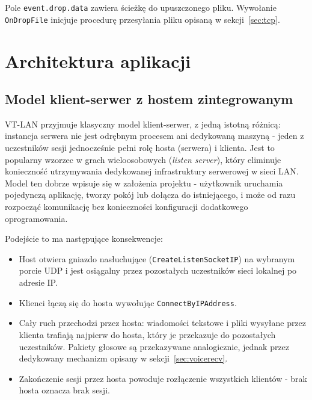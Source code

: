 Pole \texttt{event.drop.data} zawiera ścieżkę do upuszczonego pliku. Wywołanie \texttt{OnDropFile}
inicjuje procedurę przesyłania pliku opisaną w sekcji~\ref{sec:tcp}.


\section{Architektura aplikacji}
\label{sec:architektura}

\subsection*{Model klient-serwer z hostem zintegrowanym}

VT-LAN przyjmuje klasyczny model klient-serwer, z jedną istotną różnicą:
instancja serwera nie jest odrębnym procesem ani dedykowaną maszyną -
jeden z uczestników sesji jednocześnie pełni rolę hosta (serwera) i klienta.
Jest to popularny wzorzec w grach wieloosobowych (\textit{listen server}),
który eliminuje konieczność utrzymywania dedykowanej infrastruktury serwerowej
w sieci LAN. Model ten dobrze wpisuje się w założenia projektu - użytkownik
uruchamia pojedynczą aplikację, tworzy pokój lub dołącza do istniejącego,
i może od razu rozpocząć komunikację bez konieczności konfiguracji
dodatkowego oprogramowania.

Podejście to ma następujące konsekwencje:

\begin{itemize}
    \item Host otwiera gniazdo nasłuchujące (\texttt{CreateListenSocketIP})
    na wybranym porcie UDP i jest osiągalny przez pozostałych uczestników
    sieci lokalnej po adresie IP.
    \item Klienci łączą się do hosta wywołując \texttt{ConnectByIPAddress}.
    \item Cały ruch przechodzi przez hosta: wiadomości tekstowe i pliki
    wysyłane przez klienta trafiają najpierw do hosta, który je przekazuje
    do pozostałych uczestników. Pakiety głosowe są przekazywane analogicznie,
    jednak przez dedykowany mechanizm opisany w sekcji~\ref{sec:voicerecv}.
    \item Zakończenie sesji przez hosta powoduje rozłączenie wszystkich
    klientów - brak hosta oznacza brak sesji.
\end{itemize}

